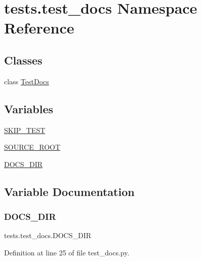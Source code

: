 \hypertarget{namespacetests_1_1test__docs}{}\section{tests.\+test\+\_\+docs Namespace Reference}
\label{namespacetests_1_1test__docs}
\subsection*{Classes}
\begin{DoxyCompactItemize}
\item 
class \hyperlink{classtests_1_1test__docs_1_1TestDocs}{Test\+Docs}
\end{DoxyCompactItemize}
\subsection*{Variables}
\begin{DoxyCompactItemize}
\item 
\hyperlink{namespacetests_1_1test__docs_a4c5e05f76d8457e68fa9926dc43cd9ce}{S\+K\+I\+P\+\_\+\+T\+E\+ST}
\item 
\hyperlink{namespacetests_1_1test__docs_a2ede9a57e3255e9217c239edda5271b6}{S\+O\+U\+R\+C\+E\+\_\+\+R\+O\+OT}
\item 
\hyperlink{namespacetests_1_1test__docs_aa63f964d4d882c6489439dcfd69daf54}{D\+O\+C\+S\+\_\+\+D\+IR}
\end{DoxyCompactItemize}


\subsection{Variable Documentation}
\mbox{\label{namespacetests_1_1test__docs_aa63f964d4d882c6489439dcfd69daf54}} 
\subsubsection{\texorpdfstring{D\+O\+C\+S\+\_\+\+D\+IR}{DOCS\_DIR}}
{\footnotesize\ttfamily tests.\+test\+\_\+docs.\+D\+O\+C\+S\+\_\+\+D\+IR}



Definition at line 25 of file test\+\_\+docs.\+py.

